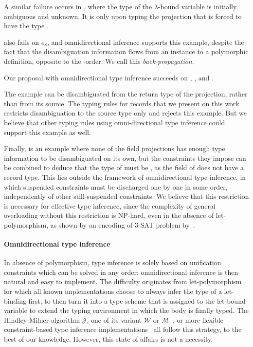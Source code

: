 \documentclass[acmsmall,screen,nonacm,review]{acmart}
\begin{document}
A similar failure occurs in , where the type of the
$\lambda$-bound variable  is initially ambiguous and
unknown. It is only upon typing the projection  that
 is forced to have the type .

\OCaml also fails on \ocaml$e_8$, and omnidirectional inference
supports this example, despite the fact that the disambiguation
information flows from an instance to a polymorphic definition, opposite to the \Geninst-order. We
call this \emph{back-propagation}.

%
Our proposal with omnidirectional type inference succeeds
on , , and .

The example  can be disambiguated from the return type of
the projection, rather than from its source. The typing rules for
records that we present on this work restricts disambiguation to the
source type only and rejects this example. But we believe that other
typing rules using omni-directional type inference could support this
example as well.

Finally,  is an example where none of the field
projections has enough type information to be disambiguated on its own, but the
constraints they impose can be combined to deduce that the type of
 must be , as the  field of 
does not have a record type. This lies outside the framework of
omnidirectional type inference, in which suspended constraints must be
discharged one by one in some order, independently of other
still-suspended constraints.
%
We believe that this restriction is necessary for effective type inference,
since the complexity of general overloading without this restriction is
NP-hard, even in the absence of let-polymorphism, as shown by an encoding of
3-SAT problem by~\citet*
{Chargueraud-Bodin-Dunfield-Riboulet/jfla2025}.

\paragraph{Omnidirectional type inference}

In absence of polymorphism, type inference is solely based on
unification constraints which can be solved in any order;
omnidirectional inference is then natural and easy to implement.  The
difficulty originates from \ML let-polymorphism for which all known
implementations choose to always infer the type of a let-binding
first, to then turn it into a type scheme that is assigned to the
let-bound variable to extend the typing environment in which the body
is finally typed. The Hindley-Milner algorithm $\mathcal{J}$, one of
its variant $\mathcal{W}$ or $\mathcal{M}$~\cite
{Lee_Yi/algoM@toplas1998}, or more flexible constraint-based type
inference
implementations~\citep*{Remy/mleth,Remy/thesis,Odersky-Sulzmann-Wehr@tpos,Pottier-Remy/emlti}
all follow this strategy, to the best of our knowledge. However, this
state of affairs is not a necessity.
\end{document}
